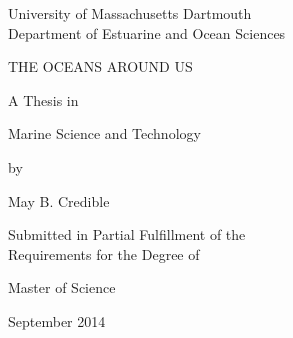 \thispagestyle{empty} 
\rule{0mm}{0.1cm}
\begin{center}
University of Massachusetts Dartmouth\\
Department of Estuarine and Ocean Sciences
\end{center}


\vspace{0.5in}

\begin{center}
{THE OCEANS AROUND US} 
\end{center}

\vspace{0.2in}

\begin{center}
A Thesis in 					%
\end{center}
\begin{center}
Marine Science and Technology 	%
\end{center}
\begin{center}
by
\end{center}

\begin{center}
May B. Credible
\end{center}


\vspace{0.2in}


\vspace{0.2in}


\begin{center}
Submitted in Partial Fulfillment of the\\
Requirements for the Degree of
\end{center}

\vspace{0.2in}
\begin{center}
Master of Science 	%
\end{center}

\vspace{0.2in}

 \begin{center} 
 September 2014  %
 \end{center}
\newpage
